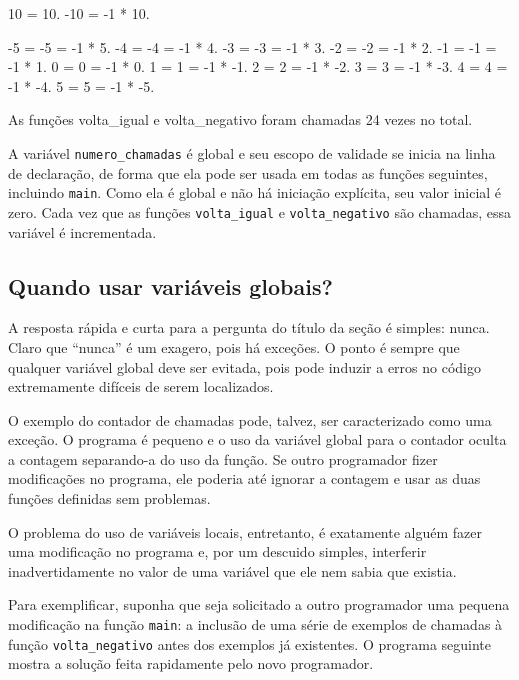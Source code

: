 \documentclass[
  11pt,
  a4paper,
]{scrbook}
\newenvironment{Shaded}{\begin{snugshade}}{\end{snugshade}}
\newcommand{\NormalTok}[1]{#1}
\begin{document}
\begin{Shaded}
\begin{Highlighting}[]
\NormalTok{10 = 10.}
\NormalTok{{-}10 = {-}1 * 10.}

\NormalTok{{-}5 = {-}5 = {-}1 * 5.}
\NormalTok{{-}4 = {-}4 = {-}1 * 4.}
\NormalTok{{-}3 = {-}3 = {-}1 * 3.}
\NormalTok{{-}2 = {-}2 = {-}1 * 2.}
\NormalTok{{-}1 = {-}1 = {-}1 * 1.}
\NormalTok{0 = 0 = {-}1 * 0.}
\NormalTok{1 = 1 = {-}1 * {-}1.}
\NormalTok{2 = 2 = {-}1 * {-}2.}
\NormalTok{3 = 3 = {-}1 * {-}3.}
\NormalTok{4 = 4 = {-}1 * {-}4.}
\NormalTok{5 = 5 = {-}1 * {-}5.}

\NormalTok{As funções volta\_igual e volta\_negativo foram chamadas 24 vezes no total.}
\end{Highlighting}
\end{Shaded}

A variável \texttt{numero\_chamadas} é global e seu escopo de validade
se inicia na linha de declaração, de forma que ela pode ser usada em
todas as funções seguintes, incluindo \texttt{main}. Como ela é global e
não há iniciação explícita, seu valor inicial é zero. Cada vez que as
funções \texttt{volta\_igual} e \texttt{volta\_negativo} são chamadas,
essa variável é incrementada.

\subsection{Quando usar variáveis
globais?}\label{quando-usar-variuxe1veis-globais}

A resposta rápida e curta para a pergunta do título da seção é simples:
nunca. Claro que ``nunca'' é um exagero, pois há exceções. O ponto é
sempre que qualquer variável global deve ser evitada, pois pode induzir
a erros no código extremamente difíceis de serem localizados.

O exemplo do contador de chamadas pode, talvez, ser caracterizado como
uma exceção. O programa é pequeno e o uso da variável global para o
contador oculta a contagem separando-a do uso da função. Se outro
programador fizer modificações no programa, ele poderia até ignorar a
contagem e usar as duas funções definidas sem problemas.

O problema do uso de variáveis locais, entretanto, é exatamente alguém
fazer uma modificação no programa e, por um descuido simples, interferir
inadvertidamente no valor de uma variável que ele nem sabia que existia.

Para exemplificar, suponha que seja solicitado a outro programador uma
pequena modificação na função \texttt{main}: a inclusão de uma série de
exemplos de chamadas à função \texttt{volta\_negativo} antes dos
exemplos já existentes. O programa seguinte mostra a solução feita
rapidamente pelo novo programador.
\end{document}
